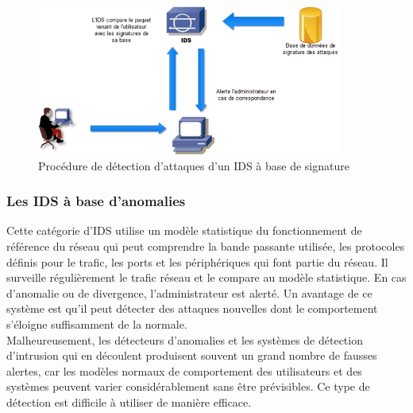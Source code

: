 \begin{figure}[h]%
    \center%
    \includegraphics[width=0.9\textwidth]{assets/IDSbaseSignatures.png}
    \caption[Procédure de détection d’attaques d’un IDS à base de signatures (source: \href{https://techno-skills.com/wp-content/uploads/2020/12/image-4.png}{techno-skills.com})]{Procédure de détection d’attaques d’un IDS à base de signature}\label{fig:ids-signature}
\end{figure}

\newpage

\subsubsection{Les IDS à base d’anomalies}

\vspace{0.5em}

Cette catégorie d’IDS utilise un modèle statistique du fonctionnement de référence du réseau qui peut comprendre la bande passante utilisée, les protocoles définis pour le trafic, les ports et les périphériques qui font partie du réseau. Il surveille régulièrement le trafic réseau et le compare au modèle statistique. En cas d’anomalie ou de divergence, l’administrateur est alerté. Un avantage de ce système est qu’il peut détecter des attaques nouvelles dont le comportement s’éloigne suffisamment de la normale.\\

Malheureusement, les détecteurs d'anomalies et les systèmes de détection d'intrusion qui en découlent produisent souvent un grand nombre de fausses alertes, car les modèles normaux de comportement des utilisateurs et des systèmes peuvent varier considérablement sans être prévisibles. Ce type de détection est difficile à utiliser de manière efficace.\\

